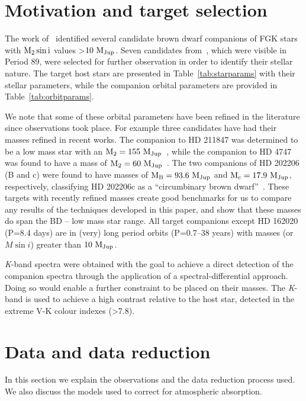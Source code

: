\documentclass[fleqn,usenatbib]{mnras}
\begin{document}
\section{Motivation and target selection}
\label{sec:motivation}
The work of~\citet{sahlmann_search_2011} identified several candidate brown dwarf companions of FGK stars with \(\rm M_2 \sin{i}\) values >\(\rm 10~M_{Jup}\). Seven candidates {from~\citet{sahlmann_search_2011}, which were visible in Period 89,  were selected for further} observation in order to identify their stellar nature. The target host stars are presented in Table~\ref{tab:starparams} with their stellar parameters, while the companion orbital parameters are provided in Table~\ref{tab:orbitparams}.

We note that some of these orbital parameters have been refined in the literature since observations took place. For example three candidates have had their masses refined in recent works. The companion to {HD 211847} was determined to be a low mass star with an \(\rm M_2=155~M_{Jup}\)~\citep{moutou_eccentricity_2017}, while the companion to {HD 4747} was found to have a mass of \(\rm M_2=60~M_{Jup}\)~\citep{crepp_trends_2016}. The two companions of {HD 202206} (B and c) were found to have masses of \(\rm M_B =93.6~M_{Jup}\) and \(\rm M_c = 17.9~M_{Jup}\), respectively, classifying {HD 202206}c as a ``circumbinary brown dwarf''~\citep{benedict_hd_2017}. These targets with recently refined masses create good benchmarks for us to compare any results of the techniques developed in this paper, and show that these masses do span the BD -- low mass star range. All target companions except {HD 162020} (P=8.4 days) are in (very) long period orbits (P=0.7--38 years) with masses (or \(M\sin{i}\)) greater than \(\rm 10~M_{Jup}\).

\textit{K}-band spectra were obtained with the goal to achieve a direct detection of the companion spectra through the application of a spectral-differential approach. Doing so would enable a further constraint to be placed on their masses. The \textit{K}-band is used to achieve a high contrast relative to the host star, detected in the extreme V-K colour indexes (>7.8).






\section{Data and data reduction}
\label{sec:data}
In this section we explain the observations and the data reduction process used. We also discuss the models used to correct for atmospheric absorption.
\end{document}
